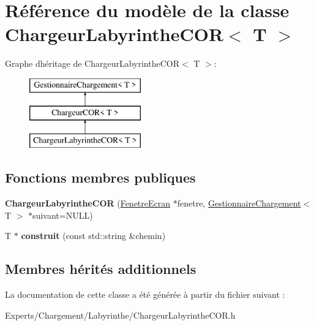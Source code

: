 \hypertarget{class_chargeur_labyrinthe_c_o_r}{}\section{Référence du modèle de la classe Chargeur\+Labyrinthe\+C\+OR$<$ T $>$}
\label{class_chargeur_labyrinthe_c_o_r}
Graphe d\textquotesingle{}héritage de Chargeur\+Labyrinthe\+C\+OR$<$ T $>$\+:\begin{figure}[H]
\begin{center}
\leavevmode
\includegraphics[height=3.000000cm]{class_chargeur_labyrinthe_c_o_r}
\end{center}
\end{figure}
\subsection*{Fonctions membres publiques}
\begin{DoxyCompactItemize}
\item 
\mbox{\label{class_chargeur_labyrinthe_c_o_r_aac75af1ca747b084b0bb6e87b9c65231}} 
{\bfseries Chargeur\+Labyrinthe\+C\+OR} (\mbox{\hyperlink{class_fenetre_ecran}{Fenetre\+Ecran}} $\ast$fenetre, \mbox{\hyperlink{class_gestionnaire_chargement}{Gestionnaire\+Chargement}}$<$ T $>$ $\ast$suivant=N\+U\+LL)
\item 
\mbox{\label{class_chargeur_labyrinthe_c_o_r_aa60ae95e78e2ff5f4b0dedc5420a0223}} 
T $\ast$ {\bfseries construit} (const std\+::string \&chemin)
\end{DoxyCompactItemize}
\subsection*{Membres hérités additionnels}


La documentation de cette classe a été générée à partir du fichier suivant \+:\begin{DoxyCompactItemize}
\item 
Experts/\+Chargement/\+Labyrinthe/Chargeur\+Labyrinthe\+C\+O\+R.\+h\end{DoxyCompactItemize}
